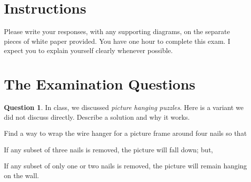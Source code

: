 \documentclass[12pt,letterpaper]{article}
\theoremstyle{definition}
\newtheorem{question}{Question}
\begin{document}
\setlength{\parskip}{1ex plus 0.5ex minus 0.2ex}
\setlength{\parindent}{0pt}

\pagestyle{fancy}
\cfoot{}

\section*{Instructions}
Please write your responses, with any supporting diagrams, on the separate pieces of white paper provided.  You have one hour to complete this exam. I expect you to explain yourself clearly whenever possible.

\section*{The Examination Questions}

\begin{question}
In class, we discussed \emph{picture hanging puzzles}. Here is a variant we did not discuss directly. Describe a solution and why it works.

Find a way to wrap the wire hanger for a picture frame around four nails so that 
\begin{compactitem}
\item If any subset of three nails is removed, the picture will fall down; but,
\item If any subset of only one or two nails is removed, the picture will remain hanging on the wall.
\end{compactitem}
\end{question}

\vspace{.5in}

%

\end{document}
